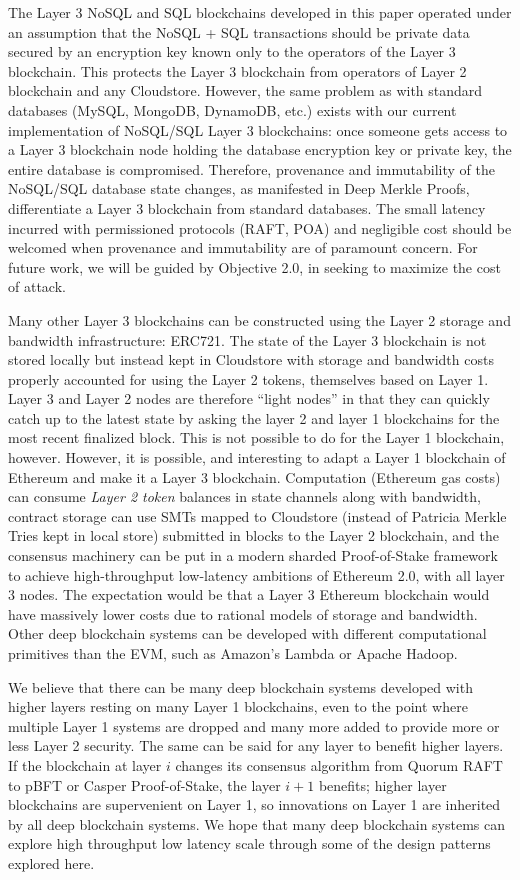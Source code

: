 \documentclass{article}
\begin{document}
The Layer 3 NoSQL and SQL blockchains developed in this paper operated under an assumption that the NoSQL + SQL transactions should be private data secured by an encryption key known only to the operators of the Layer 3 blockchain.   This protects the Layer 3 blockchain from operators of Layer 2 blockchain and any Cloudstore.  However, the same problem as with standard databases (MySQL, MongoDB, DynamoDB, etc.) exists with our current implementation of NoSQL/SQL Layer 3 blockchains: once someone gets access to a Layer 3 blockchain node holding the database encryption key or private key, the entire database is compromised. Therefore, provenance and immutability of the NoSQL/SQL database state changes, as manifested in Deep Merkle Proofs, differentiate a Layer 3 blockchain from standard databases.
The small latency incurred with permissioned protocols (RAFT, POA) and negligible cost should be welcomed when provenance and immutability are of paramount concern.       For future work, we will be guided by Objective 2.0, in seeking to maximize the cost of attack.

Many other Layer 3 blockchains can be constructed using the Layer 2 storage and bandwidth infrastructure: ERC721.  The state of the Layer 3 blockchain is not stored locally but instead kept in Cloudstore with storage and bandwidth costs properly accounted for using the Layer 2 tokens, themselves based on Layer 1.  Layer 3 and Layer 2 nodes are therefore ``light nodes'' in that they can quickly catch up to the latest state by asking the layer 2 and layer 1 blockchains for the most recent finalized block.  This is not possible to do for the Layer 1 blockchain, however.  However, it is possible, and interesting to adapt a Layer 1 blockchain of Ethereum and make it a Layer 3 blockchain.  Computation (Ethereum gas costs) can consume {\em Layer 2 token} balances in state channels along with bandwidth, contract storage can use SMTs mapped to Cloudstore (instead of Patricia Merkle Tries kept in local store) submitted in blocks to the Layer 2 blockchain, and the consensus machinery can be put in a modern sharded Proof-of-Stake framework to achieve high-throughput low-latency ambitions of Ethereum 2.0, with all layer 3 nodes.  The expectation would be that a Layer 3 Ethereum blockchain would have massively lower costs due to rational models of storage and bandwidth.   Other deep blockchain systems can be developed with different computational primitives than the EVM, such as Amazon's Lambda or Apache Hadoop.

We believe that there can be many deep blockchain systems developed with higher layers resting on many Layer 1 blockchains, even to the point where multiple Layer 1 systems are dropped and many more added to provide more or less Layer 2 security.  The same can be said for any layer to benefit higher layers.  If the blockchain at layer $i$ changes its consensus algorithm from Quorum RAFT to pBFT or Casper Proof-of-Stake, the layer $i+1$ benefits; higher layer blockchains are supervenient on Layer 1, so innovations on Layer 1 are inherited by all deep blockchain systems.  We hope that many deep blockchain systems can explore high throughput low latency scale through some of the design patterns explored here.
\end{document}
